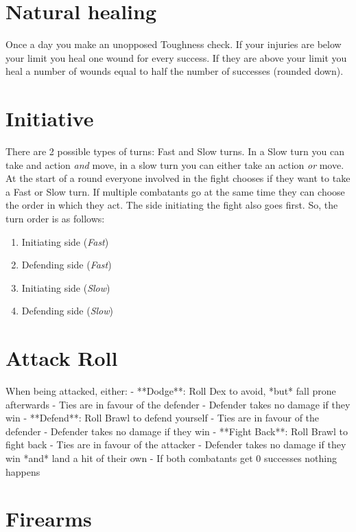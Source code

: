 \section{Natural healing}
Once a day you make an unopposed Toughness check. 
If your injuries are below your limit you heal one wound for every success. 
If they are above your limit you heal a number of wounds equal to half the number of successes (rounded down).

\section{Initiative}
There are 2 possible types of turns: Fast and Slow turns.  
In a Slow turn you can take and action \textit{and} move, in a slow turn you can either take an action \textit{or} move.  
At the start of a round everyone involved in the fight chooses if they want to take a Fast or Slow turn.
If multiple combatants go at the same time they can choose the order in which they act.
The side initiating the fight also goes first. So, the turn order is as follows: 

\begin{enumerate}
    \item Initiating side (\textit{Fast})
    \item Defending side (\textit{Fast})
    \item Initiating side (\textit{Slow})
    \item Defending side (\textit{Slow})
\end{enumerate}


\section{Attack Roll}

When being attacked, either:
  - **Dodge**: Roll Dex to avoid, *but* fall prone afterwards
    - Ties are in favour of the defender
    - Defender takes no damage if they win
  - **Defend**: Roll Brawl to defend yourself
    - Ties are in favour of the defender
    - Defender takes no damage if they win
  - **Fight Back**: Roll Brawl to fight back  
    - Ties are in favour of the attacker
    - Defender takes no damage if they win *and* land a hit of their own
  - If both combatants get 0 successes nothing happens 


\section{Firearms}

